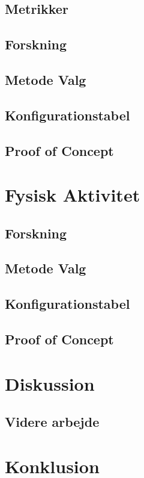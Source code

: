 \section{Metrikker}

\section{Forskning}


\section{Metode Valg}

\section{Konfigurationstabel}
\section{Proof of Concept}


\chapter{Fysisk Aktivitet}
\section{Forskning}

\section{Metode Valg}
\section{Konfigurationstabel}
\section{Proof of Concept}

\chapter{Diskussion}
\section{Videre arbejde}

\chapter{Konklusion}


